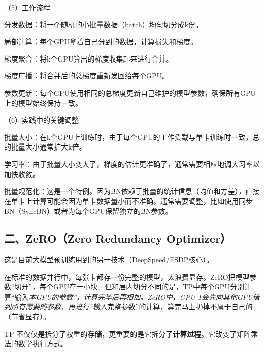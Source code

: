 （5）工作流程

分发数据：将一个随机的小批量数据（batch）均匀切分成k份。

局部计算：每个GPU拿着自己分到的数据，计算损失和梯度。

梯度聚合：将k个GPU算出的梯度收集起来进行合并。

梯度广播：将合并后的总梯度重新发回给每个GPU。

参数更新：每个GPU使用相同的总梯度更新自己维护的模型参数，确保所有GPU上的模型始终保持一致。

（6）实践中的关键调整

批量大小：在k个GPU上训练时，由于每个GPU的工作负载与单卡训练时一致，总的批量大小通常扩大k倍。

学习率：由于批量大小变大了，梯度的估计更准确了，通常需要相应地调大习率以加快收敛。

批量规范化：这是一个特例。因为BN依赖于批量的统计信息（均值和方差），直接在单卡上计算可能会因为单卡数据量小而不准确。通常需要调整，比如使用同步BN（SyncBN）或者为每个GPU保留独立的BN参数。

\hypertarget{ux4e8czerozero-redundancy-optimizer}{%
\subsection{二、ZeRO（Zero Redundancy Optimizer）}\label{ux4e8czerozero-redundancy-optimizer}}

这是目前大模型预训练用到的另一技术（DeepSpeed/FSDP核心）。

在标准的数据并行中，每张卡都存一份完整的模型，太浪费显存。ZeRO把模型参数``切开''，每个GPU存一小块。但和层内切分不同的是，TP中每个GPU分别计算``输入\emph{本GPU的参数''，计算完毕后再相加。ZeRO中，GPU 1会先向其他GPU借到所有需要的参数，再进行``输入}完整参数''的计算，算完马上扔掉不属于自己的（节省显存）。

TP 不仅仅是拆分了权重的\textbf{存储}，更重要的是它拆分了\textbf{计算过程}。它改变了矩阵乘法的数学执行方式。

